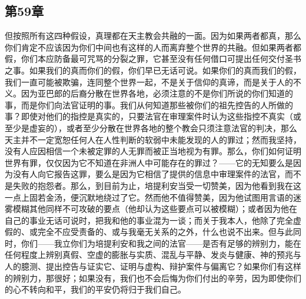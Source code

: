 \subsection{第59章}

但按照所有这四种假设，真理都在天主教会共融的一面。因为如果两者都真，那么你们肯定不应该因为你们中间也有这样的人而离弃整个世界的共融。但如果两者都假，你们本应防备最可咒骂的分裂之罪，它甚至没有任何借口可提出任何交付圣书之事。如果我们的真而你们的假，你们早已无话可说。如果你们的真而我们的假，我们一直可能被欺骗，连同整个世界一起，不是关于信仰的真谛，而是关于人的不义。因为亚巴郎的后裔分散在世界各地，必须注意的不是你们所说的你们知道的事，而是你们向法官证明的事。我们从何知道那些被你们的祖先控告的人所做的事？即使对他们的指控是真实的，只要法官在审理案件时认为这些指控不真实（或至少是虚妄的），或者至少分散在世界各地的整个教会只须注意法官的判决，那么天主并不一定宽恕任何人在人性判断的软弱中未能发现的人的罪过；然而我坚持，没有人应因相信一个未被定罪的人无罪而被正当地视为有罪。那么，你们如何证明世界有罪，仅仅因为它不知道在非洲人中可能存在的罪过？——它的无知要么是因为没有人向它报告这罪，要么是因为它相信了提供的信息中审理案件的法官，而不是失败的抱怨者。那么，到目前为止，培提利安当受一切赞美，因为他看到我在这一点上固若金汤，便沉默地绕过了它。然而他不值得赞美，因为他试图用言语的迷雾模糊其他同样不可攻破的要点（他却认为这些要点可以被模糊）；或者因为他在自己的事业无话可说时，把我和他的事业混为一谈；而关于我本人，他除了完全虚假的、或完全不应受责备的、或与我毫无关系的之外，什么也说不出来。但与此同时，你们——我立你们为培提利安和我之间的法官——是否有足够的辨别力，能在任何程度上辨别真假、空虚的膨胀与实质、混乱与平静、发炎与健康、神的预兆与人的臆测、提出控告与证实它、证明与虚构、辩护案件与偏离它？如果你们有这样的辨别力，那很好；如果没有，我们也不会后悔为你们付出的辛劳，因为即使你们的心不转向和平，我们的平安仍将归于我们自己。\par

